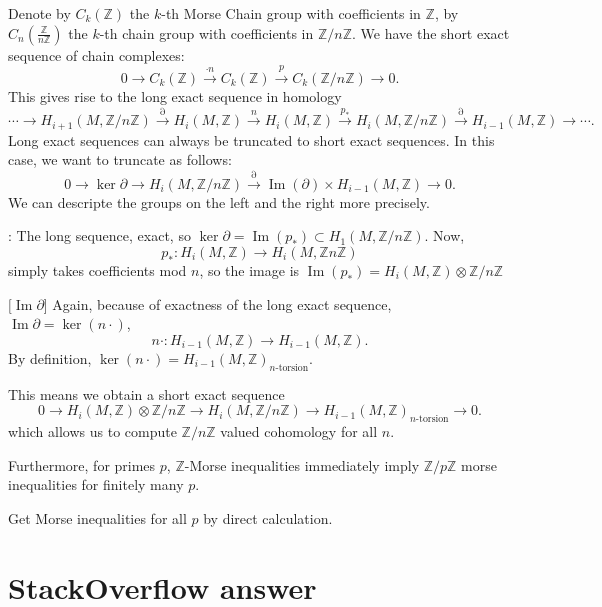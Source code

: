 \documentclass[a4paper]{article}
\newcommand\Z{\mathbb Z}
\DeclareMathOperator{\Ker}{ker}
\renewcommand{\Im}{\operatorname{Im}}
\begin{document}
Denote by $C_k(\Z)$ the $k$-th Morse Chain group with coefficients in $\Z$, by $C_n(\frac{\Z}{n\Z})$ the $k$-th chain group with coefficients in  $\Z / n \Z$.
We have the short exact sequence of chain complexes:
\[
    0 \to  C_k(\Z) \xrightarrow{\cdot n} C_k(\Z) \xrightarrow{p} C_k(\Z / n \Z) \to  0
.\] 
This gives rise to the long exact sequence in homology
\[
    \cdots \to  H_{i+1}(M, \Z / n \Z) \xrightarrow{\partial}  H_i(M, \Z) \xrightarrow{n} H_i(M, \Z) \xrightarrow{p_*} H_i(M, \Z / n \Z) \xrightarrow{\partial}  H_{i-1}(M, \Z) \to  \cdots
.\] 
Long exact sequences can always be truncated to short exact sequences. In this case, we want to truncate as follows:
\[
    0 \to  \Ker \partial \to  H_i(M, \Z / n \Z) \xrightarrow{\partial}  \Im (\partial) \times H_{i-1}(M, \Z) \to  0
.\] 
We can descripte the groups on the left and the right more precisely.
\begin{description}
    \item[$\ker \partial$ ]: The long sequence, exact, so $\Ker \partial = \Im(p_*) \subset  H_1(M, \Z / n\Z)$. Now,
        \[
            p_*: H_i(M, \Z) \to  H_i(M, \Z n \Z)
        \] 
        simply takes coefficients mod $n$, so the image is  $\Im(p_*) = H_i(M, \Z) \otimes \Z / n \Z$
    \item $[\Im \partial$] Again, because of exactness of the long exact sequence,  $\Im \partial = \ker(n \cdot)$,
        \[
            n \cdot: H_{i-1}(M, \Z) \to  H_{i-1}(M, \Z)
        .\] 
        By definition, $\Ker(n \cdot) = H_{i-1}(M, \Z)_{\text{$n$-torsion}}$.
\end{description}
This means we obtain a short exact sequence
\[
    0 \to  H_i(M, \Z) \otimes \Z / n \Z \to  H_i(M, \Z / n \Z) \to  H_{i-1}(M, \Z)_{\text{$n$-torsion}} \to  0
.\] 
which allows us to compute $\Z / n \Z$ valued cohomology for all $n$.

Furthermore, for primes $p$,  $\Z$-Morse inequalities immediately imply $\Z / p \Z$ morse inequalities for finitely many $p$.

Get Morse inequalities for all  $p$ by direct calculation.

\section{StackOverflow answer}
\end{document}
